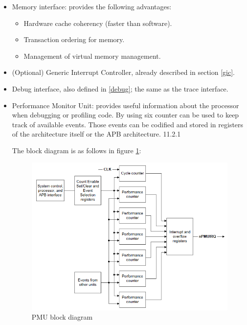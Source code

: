 \begin{itemize}
	\item { Memory interface: provides the following advantages: 
		\begin{itemize}
			\item Hardware cache coherency (faster than software).
			\item Transaction ordering for memory.
			\item Management of virtual memory management.
		\end{itemize}
 }
	\item { (Optional) Generic Interrupt Controller, already described in section \ref{gic}.}
	\item { Debug interface, also defined in \ref{debug}; the same as the trace interface. }
	\item { Performance Monitor Unit: provides useful information about the processor when debugging or profiling code. By using six counter can be used to keep track of available events. Those events can be codified and stored in registers of the architecture itself or the APB architecture. \cite{cortexA72manual} 11.2.1
	
	The block diagram is as follows in figure \ref{eventsblock}: 
	
	\begin{figure}[H]
		\centering
		\includegraphics[width=0.7\linewidth]{imgs/eventsblock}
		\caption{PMU block diagram}
		\label{eventsblock}
	\end{figure}
}
\end{itemize}